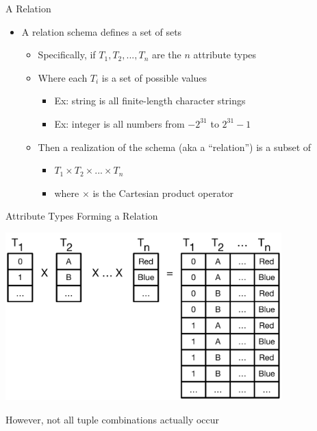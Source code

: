 \documentclass[aspectratio=169]{beamer}
\begin{document}
\begin{frame}{A Relation}

\begin{itemize}
\item A relation schema defines a set of sets
	\begin{itemize}
	\item Specifically, if $T_1, T_2, ..., T_n$ are the $n$ attribute types
	\item Where each $T_i$ is a set of possible values
		\begin{itemize}
		\item Ex: string is all finite-length character strings
		\item Ex: integer is all numbers from $-2^{31}$ to $2^{31} - 1$
		\end{itemize}
	\item Then a realization of the schema (aka a ``relation'') is a subset of
		\begin{itemize}
		\item $T_1 \times T_2 \times ... \times T_n$
		\item where $\times$ is the Cartesian product operator
		\end{itemize}
	\end{itemize}
\end{itemize}
\end{frame}
\begin{frame}{Attribute Types Forming a Relation}

{\centering\includegraphics[width=0.8\textwidth]{./lectRDBMS/attributeTypes.pdf}\par}


However, not all tuple combinations actually occur
\end{frame}
\end{document}
